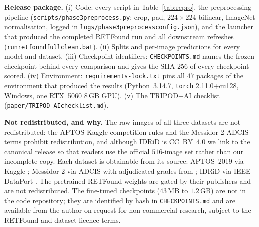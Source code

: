 \documentclass[journal]{IEEEtran}
\renewcommand{\_}{\origunderscore\allowbreak}
\begin{document}
\textbf{Release package.} (i) Code: every script in Table~\ref{tab:repro}, the
preprocessing pipeline (\texttt{scripts/\allowbreak{}phase3\_preprocess.py}; crop,
pad, $224\times224$ bilinear, ImageNet normalisation, logged in
\texttt{logs/\allowbreak{}phase3\_preprocess\_config.json}), and the launcher that
produced the completed RETFound run and all downstream refreshes
(\texttt{run\_retfound\_full\_clean.bat}). (ii) Splits and per-image
predictions for every model and dataset. (iii) Checkpoint identifiers:
\texttt{CHECKPOINTS.md} names the frozen checkpoint behind every comparison and
gives the SHA-256 of every checkpoint scored. (iv) Environment:
\texttt{requirements-lock.txt} pins all $47$ packages of the environment that
produced the results (Python~3.14.7, \texttt{torch} 2.11.0+cu128, Windows,
one RTX~5060 8\,GB GPU). (v) The TRIPOD+AI checklist
(\texttt{paper/\allowbreak{}TRIPOD-AI\_checklist.md}).

\textbf{Not redistributed, and why.} The raw images of all three datasets are
not redistributed: the APTOS Kaggle competition rules and the Messidor-2 ADCIS
terms prohibit redistribution, and although IDRiD is CC~BY~4.0 we link to the
canonical release so that readers use the official $516$-image set rather than
our incomplete copy. Each dataset is obtainable from its source: APTOS~2019 via
Kaggle \cite{aptos2019}; Messidor-2 via ADCIS \cite{decenciere2014} with
adjudicated grades from \cite{krause2018}; IDRiD via IEEE DataPort
\cite{porwal2018}. The pretrained RETFound weights are gated by their
publishers and are not redistributed. The fine-tuned checkpoints
($43$\,MB to $1.2$\,GB) are not in the code repository; they are identified by
hash in \texttt{CHECKPOINTS.md} and are available from the author on request
for non-commercial research, subject to the RETFound and dataset licence
terms.
\end{document}
